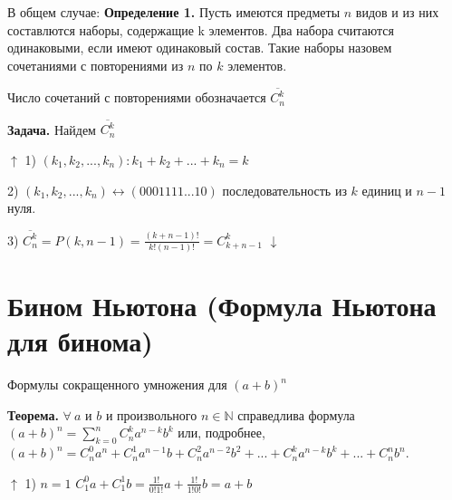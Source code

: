 \documentclass{article}
\begin{document}
    В общем случае:
    \textbf{Определение 1.} Пусть имеются предметы \(n\) видов и из них составлются наборы, содержащие k элементов. 
    Два набора считаются одинаковыми, если имеют одинаковый состав. 
    Такие наборы назовем сочетаниями с повторениями из \(n\) по \(k\) элементов.

    Число сочетаний с повторениями обозначается \(\overline{C_n^k}\)

    \textbf{Задача.} Найдем \(\overline{C_n^k}\)

    \(\uparrow\) 1) \((k_1, k_2, ..., k_n): k_1 + k_2 + ... + k_n = k\)

    2) \((k_1, k_2, ..., k_n) \leftrightarrow (0001111...10)\) последовательность из \(k\) единиц и \(n-1\) нуля.

    3) \(\overline{C_n^k} = P(k, n-1) = \frac{(k+n-1)!}{k!(n-1)!} = C_{k+n-1}^k\) \(\downarrow\)
    

    \section{Бином Ньютона (Формула Ньютона для бинома)}

    Формулы сокращенного умножения для \((a + b)^n\)

    \textbf{Теорема.} \(\forall\ a\) и \(b\) и произвольного \(n \in \mathbb{N}\) справедлива формула \((a + b)^n = \sum\limits_{k=0}^n C_n^k a^{n-k} b^k\) или, подробнее, \((a + b)^n = C_n^0 a^n + C_n^1 a^{n-1} b + C_n^2 a^{n-2} b^2 + ... + C_n^{k} a^{n-k} b^k + ... + C_n^n b^n\).

    \(\uparrow\) 1) \(n = 1\) \(C_1^0 a + C_1^1 b = \frac{1!}{0!1!} a + \frac{1!}{1!0!} b = a + b\)
\end{document}
